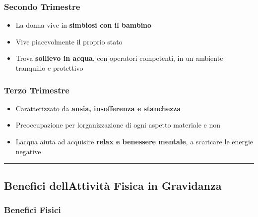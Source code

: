 \documentclass[a4paper,11pt]{article}
\providecommand{\tightlist}{%
  \setlength{\itemsep}{0pt}\setlength{\parskip}{0pt}}
\begin{document}
\subsubsection{Secondo Trimestre}\label{secondo-trimestre}

\begin{itemize}
      \tightlist
      \item
            La donna vive in \textbf{simbiosi con il bambino}
      \item
            Vive piacevolmente il proprio stato
      \item
            Trova \textbf{sollievo in acqua}, con operatori competenti, in un
            ambiente tranquillo e protettivo
\end{itemize}

\subsubsection{Terzo Trimestre}\label{terzo-trimestre}

\begin{itemize}
      \tightlist
      \item
            Caratterizzato da \textbf{ansia, insofferenza e stanchezza}
      \item
            Preoccupazione per l\textquotesingle organizzazione di ogni aspetto
            materiale e non
      \item
            L\textquotesingle acqua aiuta ad acquisire \textbf{relax e benessere
                  mentale}, a scaricare le energie negative
\end{itemize}

\begin{center}\rule{0.5\linewidth}{0.5pt}\end{center}

\subsection{Benefici dell\textquotesingle Attività Fisica in
      Gravidanza}\label{benefici-dellattivituxe0-fisica-in-gravidanza}

\subsubsection{Benefici Fisici}\label{benefici-fisici}
\end{document}
